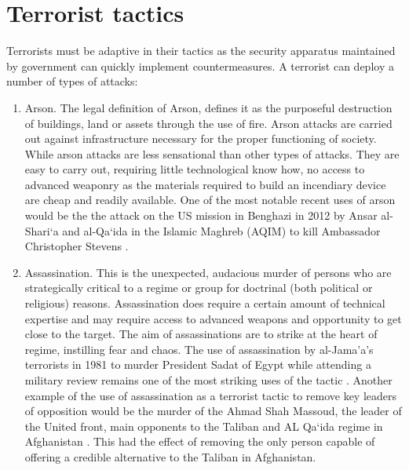 \section{Terrorist tactics}
Terrorists must be adaptive in their tactics \citep{bennett2007understanding} as the security apparatus  maintained by government can quickly implement countermeasures. A terrorist can deploy a number of types of attacks:
\begin{enumerate}
\item Arson. The legal definition of  Arson, defines it as the purposeful destruction of buildings, land or assets through the use of fire. Arson attacks are carried out against infrastructure necessary for the proper functioning of society. While arson attacks are less sensational than other types of attacks.  They are easy to carry out, requiring little technological know how, no access to advanced weaponry as the materials required to build an incendiary device are cheap and readily available. One of the most notable recent uses of arson would be the the attack on the US mission in Benghazi in 2012 by Ansar al-Shari`a and al-Qa`ida in the Islamic Maghreb (AQIM) to kill Ambassador Christopher Stevens \citep{maldonado2015leading}.
\item Assassination. This is the unexpected, audacious murder of persons who are strategically critical to a regime or group for doctrinal (both political or religious) reasons. Assassination does require a certain amount of technical expertise and may require access to advanced weapons and opportunity to get close to the target. The aim of assassinations are to strike at the heart of regime, instilling fear and chaos.  The use of assassination by al-Jama'a's terrorists in 1981 to murder President Sadat of Egypt while attending a military review remains one of the most striking uses of the tactic \citep{haykal1983autumn}. Another example of the use of assassination as a terrorist tactic to remove key leaders of opposition would be the murder of the Ahmad Shah Massoud, the leader of the United front, main opponents to the Taliban and AL Qa`ida regime in Afghanistan \citep{wolf2003assassination}. This had the effect of removing the only person capable of offering a credible alternative to the Taliban \citep{rashid2001fires} in Afghanistan.

\end{enumerate}
